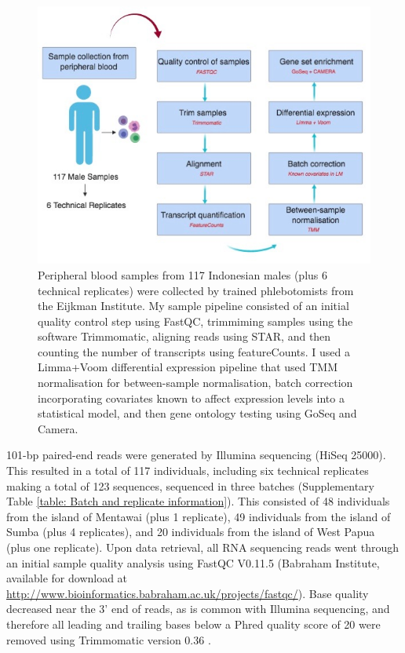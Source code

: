 \documentclass[12pt,a4paper,titlepage,twoside,openright]{book}
\begin{document}
\begin{mainmatter}
{{\begin{figure}[htb!]
\centering
\includegraphics[width=\textwidth,height=\textheight,keepaspectratio]{Figures/SamplePipeline.jpg}
\caption{Peripheral blood samples from 117 Indonesian males (plus 6 technical replicates) were collected by trained phlebotomists from the Eijkman Institute. My sample pipeline consisted of an initial quality control step using FastQC, trimmiming samples using the software Trimmomatic, aligning reads using STAR, and then counting the number of transcripts using featureCounts. I used a Limma+Voom differential expression pipeline that used TMM normalisation for between-sample normalisation, batch correction incorporating covariates known to affect expression levels into a statistical model, and then gene ontology testing using GoSeq and Camera.}
\label{fig:Study Pipeline}
\end{figure}

101-bp paired-end reads were generated by Illumina sequencing (HiSeq 25000). This resulted in a total of 117 individuals, including six technical replicates making a total of 123 sequences, sequenced in three batches (Supplementary Table \ref{table: Batch and replicate information}). This consisted of 48 individuals from the island of Mentawai (plus 1 replicate), 49 individuals from the island of Sumba (plus 4 replicates), and 20 individuals from the island of West Papua (plus one replicate). Upon data retrieval, all RNA sequencing reads went through an initial sample quality analysis using FastQC V0.11.5 (Babraham Institute, available for download at \url{http://www.bioinformatics.babraham.ac.uk/projects/fastqc/}). Base quality decreased near the 3’ end of reads, as is common with Illumina sequencing, and therefore all leading and trailing bases below a Phred quality score of 20 were removed using Trimmomatic version 0.36 \cite{bolger2014trimmomatic}.

}}
\end{mainmatter}
\end{document}
